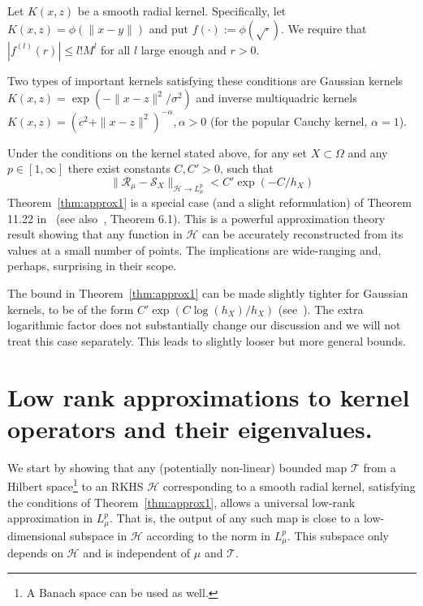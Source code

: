 \documentclass[final,12pt]{colt2018}
\renewcommand{\H}{\mathcal{H}}
\newcommand{\I}{\mathcal{R_{\mu}}}
\newcommand{\T}{\mathcal{T}}
\newcommand{\LpL}{{L^p_\mu}}
\renewcommand{\S}{{\mathcal S}}
\newenvironment{customthm}[1]
  {\renewcommand\theinnercustomthm{#1}\innercustomthm}
  {\endinnercustomthm}
\begin{document}
Let $K(x,z)$ be a smooth radial kernel.  Specifically, let $K(x,z) = \phi (\|x - y\|)$ and put $f(\cdot):= \phi(\sqrt{\cdot})$. We require that $|f^{(l)}(r)| \le l! M^l$ for all $l$ large enough and $r>0$.  

Two types of important kernels satisfying these conditions are Gaussian kernels $K(x,z)=\exp\left(-{\|x-z\|^2}/{\sigma^2}\right)$ and inverse multiquadric kernels $K(x,z)=(c^2 + \|x-z\|^2)^{-\alpha}, \alpha>0$ (for the popular Cauchy kernel, $\alpha=1$). 

\begin{customthm}{A}\label{thm:approx1} 
Under the conditions on the kernel stated above,  for any set $X\subset \Omega$ and any $p \in [1,\infty]$ there exist constants $C,C' > 0$, such that
$$
\|\I - \S_X\|_{\H \to \LpL} < C' \exp(-C/h_X)
$$
\end{customthm}
Theorem~\ref{thm:approx1} is a special case (and a slight reformulation)  of  Theorem 11.22 in~\cite{wendland2004scattered} (see also~\cite{rieger2010sampling}, Theorem 6.1). This is a powerful approximation theory result showing that any function in $\H$ can be accurately reconstructed from its values at a small number of points. The implications are wide-ranging and, perhaps, surprising in their scope.

\smallskip
\begin{remark} The bound in Theorem~\ref{thm:approx1}  can be made slightly tighter  for Gaussian kernels, to be of the form $C'\exp (C\log(h_X)/h_X)$ (see~\cite{wendland2004scattered}). The extra logarithmic factor does not substantially change our discussion and we will not treat this case separately. This leads to  slightly looser but more general bounds.
\end{remark}


\section{Low rank approximations to kernel operators and their eigenvalues.}\label{sec:eigs}

We start by showing that any (potentially  non-linear) bounded map $\T$ from a Hilbert space\footnote{A Banach space can be used as well.} to an RKHS $\H$ corresponding to a smooth radial kernel, satisfying the conditions of Theorem~\ref{thm:approx1}, allows a universal  low-rank approximation in $\LpL$. That is,  the output of any such map is close to a low-dimensional subspace in $\H$ according to the norm in $\LpL$. This subspace only depends on $\H$ and is independent of $\mu$ and $\T$.  
 
\end{document}
